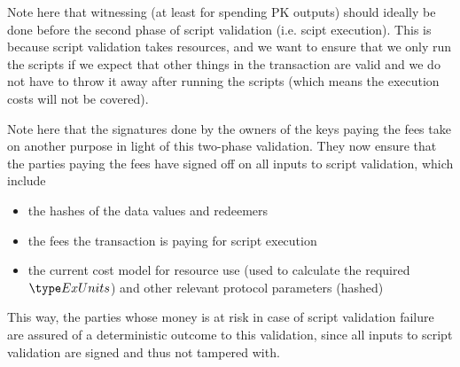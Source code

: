 Note here that witnessing (at least for spending PK outputs) should ideally
be done before the second phase of script validation (i.e. scipt execution).
This is because script validation takes resources, and we want to ensure
that we only run the scripts if we expect that other things in the transaction are
valid and we do not have to throw it away after running the scripts (which means
the execution costs will not be covered).

Note here that the signatures done by the owners of the keys paying the fees
take on another purpose in light of this two-phase validation.
They now ensure that the parties paying the fees have signed off on all
inputs to script validation, which include

\begin{itemize}
  \item the hashes of the data values and redeemers
  \item the fees the transaction is paying for script execution
  \item the current cost model for resource use (used to calculate
  the required $\ExUnits$) and other relevant protocol parameters (hashed)
\end{itemize}

This way, the parties whose money is at risk in case of script validation
failure are assured of a deterministic outcome to this validation, since
all inputs to script validation are signed and thus not tampered with.


